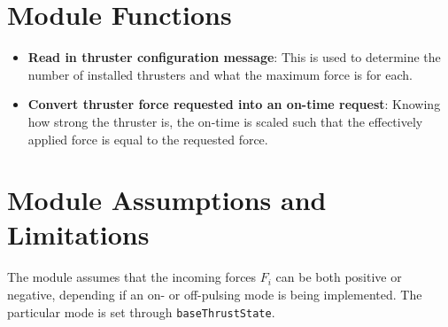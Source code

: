 


\section{Module Functions}
\begin{itemize}
	\item \textbf{Read in thruster configuration message}: This is used to determine the number of installed thrusters and what the maximum force is for each.
	\item \textbf{Convert thruster force requested into an on-time request}: Knowing how strong the thruster is, the on-time is scaled such that the effectively applied force is equal to the requested force.
\end{itemize}

\section{Module Assumptions and Limitations}
The module assumes that the incoming forces $F_{i}$ can be both positive or negative, depending if an on- or off-pulsing mode is being implemented.  The particular mode is set through {\tt baseThrustState}.  